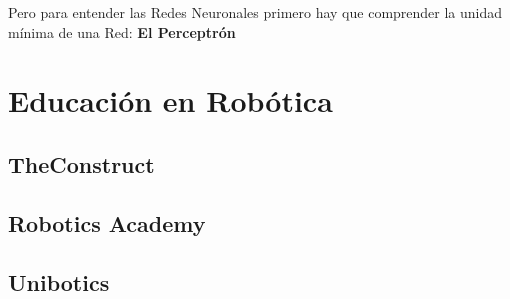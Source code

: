 Pero para entender las Redes Neuronales primero hay que comprender la unidad mínima de una Red: \textbf{El Perceptrón}\\

\section{Educación en Robótica}
\label{sec:educacion_robotica}

\subsection{TheConstruct}
\label{sec:the_construct}

\subsection{Robotics Academy}
\label{sec:robotics_academy}

\subsection{Unibotics}
\label{sec:unibotics}


